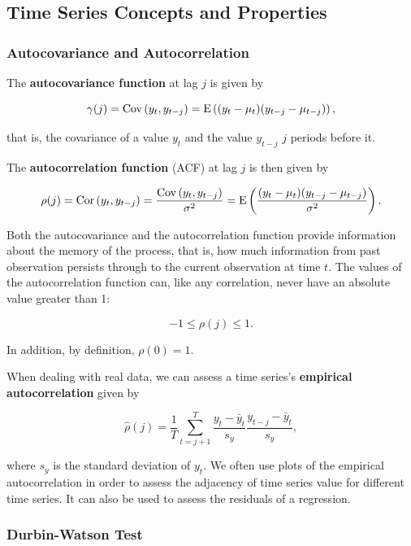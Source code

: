 \subsection{Time Series Concepts and Properties}

\subsubsection{Autocovariance and Autocorrelation}

The \textbf{autocovariance function} at lag $j$ is given by

\begin{equation}
	\gamma(j) = \mathrm{Cov}\left({y_t,y_{t-j}}\right) = \mathrm{E}\left({(y_t-\mu_t)(y_{t-j}-\mu_{t-j})}\right),
\end{equation}

that is, the covariance of a value $y_t$ and the value $y_{t-j}$ $j$ periods before it. 

The \textbf{autocorrelation function} (ACF) at lag $j$ is then given by 

\begin{equation}
  \rho(j) = \mathrm{Cor}\left({y_t,y_{t-j}}\right) = \frac{\mathrm{Cov}\left({y_t,y_{t-j}}\right)}{\sigma^2} = \mathrm{E}\left({\frac{(y_t-\mu_t)(y_{t-j}-\mu_{t-j})}{\sigma^2}}\right).
\end{equation}

Both the autocovariance and the autocorrelation function provide information about the memory of the process, that is, how much information from past observation persists through to the current observation at time $t$. The values of the autocorrelation function can, like any correlation, never have an absolute value greater than 1:

\[
	-1 \leq \rho(j) \leq 1.
\]

In addition, by definition, $\rho(0)=1$. 

When dealing with real data, we can assess a time series's \textbf{empirical autocorrelation} given by

\begin{equation}
  \hat{\rho}(j) = \frac{1}{T} \sum^T_{t=j+1}\frac{y_t-\bar{y}_t}{s_y}\frac{y_{t-j}-\bar{y}
  _t}{s_y},
\end{equation}

where $s_y$ is the standard deviation of $y_t$. We often use plots of the empirical autocorrelation in order to assess the adjacency of time series value for different time series. It can also be used to assess the residuals of a regression.

\subsubsection{Durbin-Watson Test}

